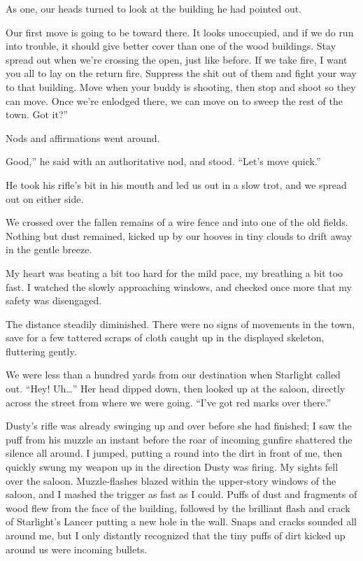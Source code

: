 As one, our heads turned to look at the building he had pointed out.

\leavevmode{}Our first move is going to be toward there. It looks unoccupied, and if we do run into trouble, it should give better cover than one of the wood buildings. Stay spread out when we’re crossing the open, just like before. If we take fire, I want you all to lay on the return fire. Suppress the shit out of them and fight your way to that building. Move when your buddy is shooting, then stop and shoot so they can move. Once we’re enlodged there, we can move on to sweep the rest of the town. Got it?”

Nods and affirmations went around.

\leavevmode{}Good,” he said with an authoritative nod, and stood. “Let’s move quick.”

He took his rifle’s bit in his mouth and led us out in a slow trot, and we spread out on either side.

We crossed over the fallen remains of a wire fence and into one of the old fields. Nothing but dust remained, kicked up by our hooves in tiny clouds to drift away in the gentle breeze.

My heart was beating a bit too hard for the mild pace, my breathing a bit too fast. I watched the slowly approaching windows, and checked once more that my safety was disengaged.

The distance steadily diminished. There were no signs of movements in the town, save for a few tattered scraps of cloth caught up in the displayed skeleton, fluttering gently.

We were less than a hundred yards from our destination when Starlight called out. “Hey! Uh…” Her head dipped down, then looked up at the saloon, directly across the street from where we were going. “I’ve got red marks over there.”

Dusty’s rifle was already swinging up and over before she had finished; I saw the puff from his muzzle an instant before the roar of incoming gunfire shattered the silence all around. I jumped, putting a round into the dirt in front of me, then quickly swung my weapon up in the direction Dusty was firing. My sights fell over the saloon. Muzzle-flashes blazed within the upper-story windows of the saloon, and I mashed the trigger as fast as I could. Puffs of dust and fragments of wood flew from the face of the building, followed by the brilliant flash and crack of Starlight’s Lancer putting a new hole in the wall. Snaps and cracks sounded all around me, but I only distantly recognized that the tiny puffs of dirt kicked up around us were incoming bullets.

